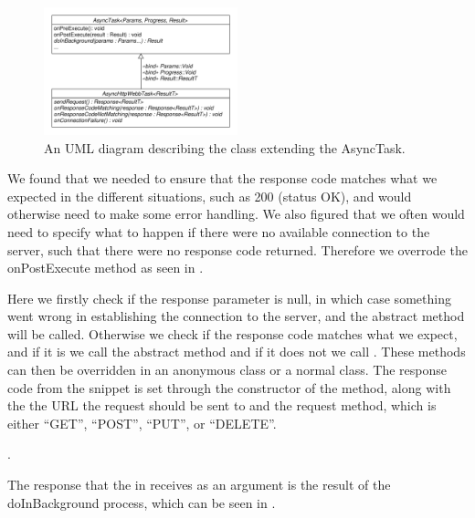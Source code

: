 \begin{figure}[!htbp]
    \centering
    \includegraphics[width=0.5\textwidth]{graphic/architecture/async_http_webb_task.pdf}
    \caption{An UML diagram describing the class extending the AsyncTask.}
    \label{fig:async_http_webb_task}
\end{figure}
\FloatBarrier

We found that we needed to ensure that the response code matches what we expected in the different situations, such as 200 (status OK), and would otherwise need to make some error handling. We also figured that we often would need to specify what to happen if there were no available connection to the server, such that there were no response code returned. Therefore we overrode the onPostExecute method as seen in . 



Here we firstly check if the response parameter is null, in which case something went wrong in establishing the connection to the server, and the abstract method  will be called. Otherwise we check if the response code matches what we expect, and if it is we call the abstract method  and if it does not we call . These methods can then be overridden in an anonymous class or a normal class. The response code from the snippet is set through the constructor of the method, along with the the URL the request should be sent to and the request method, which is either ``GET'', ``POST'', ``PUT'', or ``DELETE''. 

.

The response that the  in  receives as an argument is the result of the doInBackground process, which can be seen in . 

